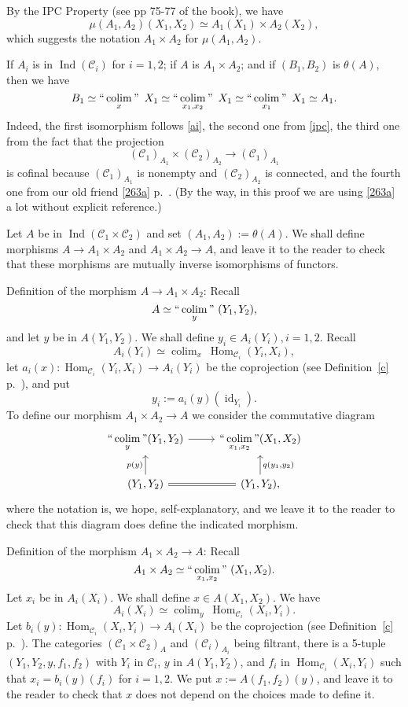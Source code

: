 \documentclass[12pt]{article}
\theoremstyle{remark}
\theoremstyle{definition}
\newcommand{\C}{\mathcal C}
\DeclareMathOperator*{\coli}{colim}
\DeclareMathOperator*{\co}{colim}
\DeclareMathOperator*{\ic}{``\coli"}
\DeclareMathOperator{\id}{id}
\DeclareMathOperator{\Hom}{Hom}%
\DeclareMathOperator{\Ind}{Ind}
\begin{document}
By the IPC Property (see pp 75-77 of the book), we have
%
\begin{equation}\label{ipc}
\mu(A_1,A_2)(X_1,X_2)\simeq A_1(X_1)\times A_2(X_2), 
\end{equation}
%
which suggests the notation $A_1\times A_2$ for $\mu(A_1,A_2)$. 

If $A_i$ is in $\Ind(\C_i)$ for $i=1,2$; if $A$ is $A_1\times A_2$; and if $(B_1,B_2)$ is $\theta(A)$, then we have 
$$ 
B_1\simeq\ic_x\ X_1\simeq\ic_{x_1,x_2}\ X_1\simeq\ic_{x_1}\ X_1\simeq A_1.
$$ 
Indeed, the first isomorphism follows \eqref{ai}, the second one from \eqref{ipc}, the third one from the fact that the projection 
$$
(\C_1)_{A_1}\times(\C_2)_{A_2}\to(\C_1)_{A_1}
$$ 
is cofinal because $(\C_1)_{A_1}$ is nonempty and $(\C_2)_{A_2}$ is connected, and the fourth one from our old friend \eqref{263a} p.~\pageref{263a}. (By the way, in this proof we are using \eqref{263a} a lot without explicit reference.) 

Let $A$ be in $\Ind(\C_1\times\C_2)$ and set $(A_1,A_2):=\theta(A)$. We shall define morphisms $A\to A_1\times A_2$ and $A_1\times A_2\to A$, and leave it to the reader to check that these morphisms are mutually inverse isomorphisms of functors. 

Definition of the morphism $A\to A_1\times A_2$: Recall 
$$
A\simeq\ic_y\ (Y_1,Y_2), 
$$ 
and let $y$ be in $A(Y_1,Y_2)$. We shall define $y_i\in A_i(Y_i),i=1,2$. Recall 
$$
A_i(Y_i)\simeq\co_x\ \Hom_{\C_i}(Y_i,X_i), 
$$ 
let $a_i(x):\Hom_{\C_i}(Y_i,X_i)\to A_i(Y_i)$ be the coprojection (see Definition~\ref{c} p.~\pageref{c}), and put 
$$
y_i:=a_i(y)(\id_{Y_i}). 
$$ 
To define our morphism $A_1\times A_2\to A$ we consider the commutative diagram
$$
\begin{tikzcd}
\displaystyle\ic_y(Y_1,Y_2)\ar{r}&\displaystyle\ic_{x_1,x_2}(X_1,X_2)\\ 
(Y_1,Y_2)\ar{u}{p(y)}\ar[equal]{r}&(Y_1,Y_2),\ar{u}[swap]{q(y_1,y_2)}
\end{tikzcd}
$$ 
where the notation is, we hope, self-explanatory, and we leave it to the reader to check that this diagram does define the indicated morphism.

Definition of the morphism $A_1\times A_2\to A$: Recall 
$$
A_1\times A_2\simeq\ic_{x_1,x_2}\ (X_1,X_2). 
$$ 
Let $x_i$ be in $A_i(X_i)$. We shall define $x\in A(X_1,X_2)$. We have 
$$
A_i(X_i)\simeq\co_y\ \Hom_{\C_i}(X_i,Y_i). 
$$
Let $b_i(y):\Hom_{\C_i}(X_i,Y_i)\to A_i(X_i)$ be the coprojection (see Definition~\ref{c} p.~\pageref{c}). The categories $(\C_1\times\C_2)_A$ and $(\C_i)_{A_i}$ being filtrant, there is a 5-tuple $(Y_1,Y_2,y,f_1,f_2)$ with $Y_i$ in $\C_i$, $y$ in $A(Y_1,Y_2)$, and $f_i$ in $\Hom_{\C_i}(X_i,Y_i)$ such that $x_i=b_i(y)(f_i)$ for $i=1,2$. We put $x:=A(f_1,f_2)(y)$, and leave it to the reader to check that $x$ does not depend on the choices made to define it.
\end{document}
